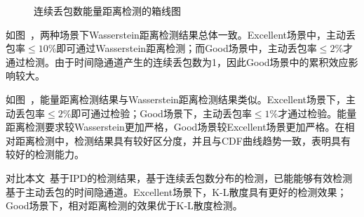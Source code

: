 {	\begin{figure}[htb]
        \centering
        \caption{连续丢包数能量距离检测的箱线图}
        \label{fig:3:result:burst:ed}
	\end{figure}
}

如图\ ，两种场景下Wasserstein距离检测结果总体一致。Excellent场景中，主动丢包率$\le 10\%$即可通过Wasserstein距离检测；而Good场景中，主动丢包率$\le 2\%$才通过检测。由于时间隐通道产生的连续丢包数为1，因此Good场景中的累积效应影响较大。

如图\ ，能量距离检测结果与Wasserstein距离检测结果类似。Excellent场景下，主动丢包率$\le 2\%$即可通过检验；Good场景下，主动丢包率$\le 1\%$才通过检验。能量距离检测要求较Wasserstein更加严格，Good场景较Excellent场景更加严格。在相对距离检测中，检测结果具有较好区分度，并且与CDF曲线趋势一致，表明具有较好的检测能力。

对比本文\ 基于IPD的检测结果，基于连续丢包数分布的检测，已能能够有效检测基于主动丢包的时间隐通道。Excellent场景下，K-L散度具有更好的检测效果；Good场景下，相对距离检测的效果优于K-L散度检测。

